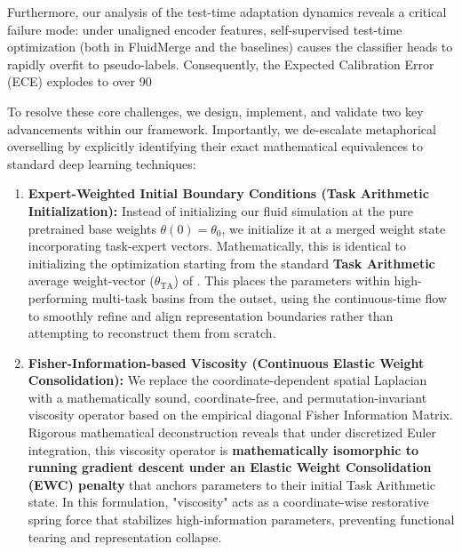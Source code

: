 Furthermore, our analysis of the test-time adaptation dynamics reveals a critical failure mode: under unaligned encoder features, self-supervised test-time optimization (both in FluidMerge and the baselines) causes the classifier heads to rapidly overfit to pseudo-labels. Consequently, the Expected Calibration Error (ECE) explodes to over 90%

To resolve these core challenges, we design, implement, and validate two key advancements within our framework. Importantly, we de-escalate metaphorical overselling by explicitly identifying their exact mathematical equivalences to standard deep learning techniques:
\begin{enumerate}
    \item \textbf{Expert-Weighted Initial Boundary Conditions (Task Arithmetic Initialization):} Instead of initializing our fluid simulation at the pure pretrained base weights $\theta(0) = \theta_0$, we initialize it at a merged weight state incorporating task-expert vectors. Mathematically, this is identical to initializing the optimization starting from the standard \textbf{Task Arithmetic} average weight-vector ($\theta_{\text{TA}}$) of \citet{ilharco2023editing}. This places the parameters within high-performing multi-task basins from the outset, using the continuous-time flow to smoothly refine and align representation boundaries rather than attempting to reconstruct them from scratch.
    \item \textbf{Fisher-Information-based Viscosity (Continuous Elastic Weight Consolidation):} We replace the coordinate-dependent spatial Laplacian with a mathematically sound, coordinate-free, and permutation-invariant viscosity operator based on the empirical diagonal Fisher Information Matrix. Rigorous mathematical deconstruction reveals that under discretized Euler integration, this viscosity operator is \textbf{mathematically isomorphic to running gradient descent under an Elastic Weight Consolidation (EWC) penalty} \cite{kirkpatrick2017overcoming} that anchors parameters to their initial Task Arithmetic state. In this formulation, "viscosity" acts as a coordinate-wise restorative spring force that stabilizes high-information parameters, preventing functional tearing and representation collapse.
\end{enumerate}

